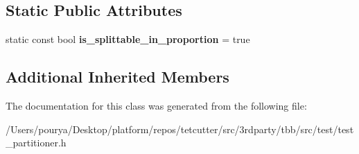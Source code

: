 \subsection*{Static Public Attributes}
\begin{DoxyCompactItemize}
\item 
\hypertarget{classtest__partitioner__utils_1_1TestRanges_1_1BlockedRange_afe9c7069eade6bae9a789389f381aa6e}{}static const bool {\bfseries is\+\_\+splittable\+\_\+in\+\_\+proportion} = true\label{classtest__partitioner__utils_1_1TestRanges_1_1BlockedRange_afe9c7069eade6bae9a789389f381aa6e}

\end{DoxyCompactItemize}
\subsection*{Additional Inherited Members}


The documentation for this class was generated from the following file\+:\begin{DoxyCompactItemize}
\item 
/\+Users/pourya/\+Desktop/platform/repos/tetcutter/src/3rdparty/tbb/src/test/test\+\_\+partitioner.\+h\end{DoxyCompactItemize}
